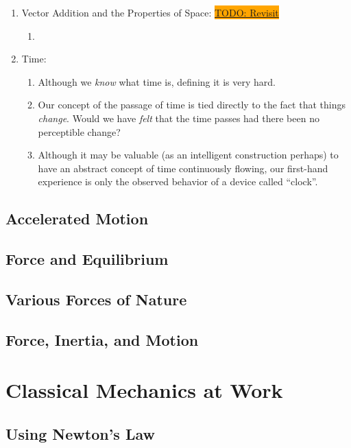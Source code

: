\documentclass[12pt,a4paper]{book}
\newcommand\TODO[1]{\colorbox{orange}{\underline{\tiny{TODO: #1}}}}
\begin{document}
\begin{enumerate}
\begin{enumerate}
\begin{enumerate}
                        \textbf{However, the use of oblique coordinate system like this is rather special}.
                \end{enumerate}
        \end{enumerate}
    \item Vector Addition and the Properties of Space:
        \TODO{Revisit}
        \begin{enumerate}
            \item 
        \end{enumerate}
    \item Time:
        \begin{enumerate}
            \item Although we \emph{know} what time is, defining it is very hard.
            \item Our concept of the passage of time is tied directly to the fact that things \emph{change}. Would we have \emph{felt} that the time passes had there been no perceptible change?
            \item Although it may be valuable (as an intelligent construction perhaps) to have an abstract concept of time continuously flowing, our first-hand experience is only the observed behavior of a device called ``clock''.
        \end{enumerate}
\end{enumerate}

\chapter{Accelerated Motion} \label{ch: 3-accelerated-motion}
\chapter{Force and Equilibrium} \label{ch: 4-force-equilibrium}
\chapter{Various Forces of Nature} \label{ch: 5-forces-of-nature}
\chapter{Force, Inertia, and Motion} \label{ch: 6-force-inertia-motion}
\part{Classical Mechanics at Work}
\chapter{Using Newton's Law} \label{ch: 7-newtons-law}
\end{document}
